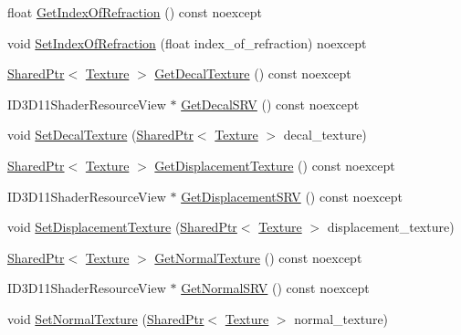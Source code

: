 \begin{DoxyCompactItemize}
\item 
float \hyperlink{structmage_1_1_shaded_material_a4078cfbed3a919214428ab01d991b589}{Get\+Index\+Of\+Refraction} () const noexcept
\item 
void \hyperlink{structmage_1_1_shaded_material_af287d28549dc682fe4f067a6e30b71a8}{Set\+Index\+Of\+Refraction} (float index\+\_\+of\+\_\+refraction) noexcept
\item 
\hyperlink{namespacemage_a1e01ae66713838a7a67d30e44c67703e}{Shared\+Ptr}$<$ \hyperlink{classmage_1_1_texture}{Texture} $>$ \hyperlink{structmage_1_1_shaded_material_affd31417050c3fa426791fa521c03fc9}{Get\+Decal\+Texture} () const noexcept
\item 
I\+D3\+D11\+Shader\+Resource\+View $\ast$ \hyperlink{structmage_1_1_shaded_material_ad16addcaa9b32b7a9d5ce793d55b1b2c}{Get\+Decal\+S\+RV} () const noexcept
\item 
void \hyperlink{structmage_1_1_shaded_material_a4acb72c80dfc51dacb5cba6621234685}{Set\+Decal\+Texture} (\hyperlink{namespacemage_a1e01ae66713838a7a67d30e44c67703e}{Shared\+Ptr}$<$ \hyperlink{classmage_1_1_texture}{Texture} $>$ decal\+\_\+texture)
\item 
\hyperlink{namespacemage_a1e01ae66713838a7a67d30e44c67703e}{Shared\+Ptr}$<$ \hyperlink{classmage_1_1_texture}{Texture} $>$ \hyperlink{structmage_1_1_shaded_material_acf3273d75933ca238075150dd7cc7dca}{Get\+Displacement\+Texture} () const noexcept
\item 
I\+D3\+D11\+Shader\+Resource\+View $\ast$ \hyperlink{structmage_1_1_shaded_material_ac33beb240df46ad6295425851cafc996}{Get\+Displacement\+S\+RV} () const noexcept
\item 
void \hyperlink{structmage_1_1_shaded_material_ab96c9ab7165ebb330790b15460b53c3b}{Set\+Displacement\+Texture} (\hyperlink{namespacemage_a1e01ae66713838a7a67d30e44c67703e}{Shared\+Ptr}$<$ \hyperlink{classmage_1_1_texture}{Texture} $>$ displacement\+\_\+texture)
\item 
\hyperlink{namespacemage_a1e01ae66713838a7a67d30e44c67703e}{Shared\+Ptr}$<$ \hyperlink{classmage_1_1_texture}{Texture} $>$ \hyperlink{structmage_1_1_shaded_material_a879b003bf09d4985c028d134cdbe46eb}{Get\+Normal\+Texture} () const noexcept
\item 
I\+D3\+D11\+Shader\+Resource\+View $\ast$ \hyperlink{structmage_1_1_shaded_material_a5fd4dfbf132fa697fafbbac082ab8bdb}{Get\+Normal\+S\+RV} () const noexcept
\item 
void \hyperlink{structmage_1_1_shaded_material_a681531e5a979ebdc4a0e8933a2439c0f}{Set\+Normal\+Texture} (\hyperlink{namespacemage_a1e01ae66713838a7a67d30e44c67703e}{Shared\+Ptr}$<$ \hyperlink{classmage_1_1_texture}{Texture} $>$ normal\+\_\+texture)

\end{DoxyCompactItemize}

